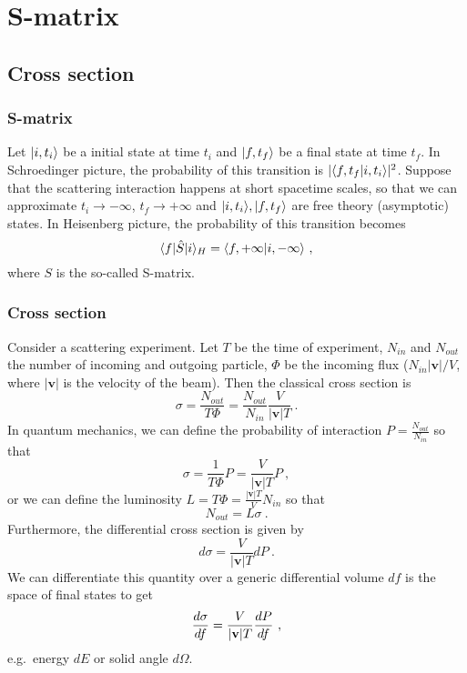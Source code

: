 \part{S-matrix}

\chapter{Cross section}

\section{S-matrix}

    Let $\vert i, t_i\rangle$ be a initial state at time $t_i$ and $\vert f, t_f\rangle$ be a final state at time $t_f$. In Schroedinger picture, the probability of this transition is $|\langle f, t_f\vert i, t_i\rangle|^2$. Suppose that the scattering interaction happens at short spacetime scales, so that we can approximate $t_i \rightarrow - \infty$, $t_f \rightarrow + \infty$ and $\vert i, t_i\rangle, \vert f, t_f\rangle$ are free theory (asymptotic) states. In Heisenberg picture, the probability of this transition becomes
    \begin{equation*}
        \langle f\vert \hat S \vert i\rangle_H =\langle f, + \infty\vert i, - \infty\rangle ~,
    \end{equation*}
    where $S$ is the so-called S-matrix.

\section{Cross section}

    Consider a scattering experiment. Let $T$ be the time of experiment, $N_{in}$ and $N_{out}$ the number of incoming and outgoing particle, $\Phi$ be the incoming flux ($N_{in} |\mathbf v|  / V$, where $|\mathbf v| $ is the velocity of the beam). Then the classical cross section is 
    \begin{equation*}
        \sigma = \frac{N_{out}}{T \Phi} = \frac{N_{out}}{N_{in}} \frac{V}{|\mathbf v| T} ~.
    \end{equation*}
    In quantum mechanics, we can define the probability of interaction $P = \frac{N_{out}}{N_{in}}$ so that 
    \begin{equation*}
        \sigma = \frac{1}{T \Phi} P = \frac{V}{|\mathbf v| T} P ~,
    \end{equation*}
    or we can define the luminosity $L = T \Phi = \frac{|\mathbf v| T}{V} N_{in}$ so that
    \begin{equation*}
        N_{out} = L \sigma ~.
    \end{equation*}
    Furthermore, the differential cross section is given by    
    \begin{equation}\label{cross1}
        d \sigma = \frac{V}{|\mathbf v| T} dP ~.
    \end{equation}
    We can differentiate this quantity over a generic differential volume $df$ is the space of final states to get
    \begin{equation*}
        \frac{d\sigma}{df} = \frac{V}{|\mathbf v| T} \frac{dP}{df} ~,
    \end{equation*}
    e.g.~energy $dE$ or solid angle $d\Omega$.

